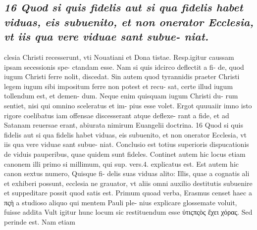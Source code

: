 \documentclass{article}
\begin{document}
\begin{pages}
\subsection*{\textit{16 Quod si quis fidelis aut si qua fidelis habet viduas, eis subuenito, et non onerator Ecclesia, vt iis qua vere viduae sant subue- niat.}}clesia Christi recesserunt, vti Nouatiani et Dona tistae. Resp.igitur caussam ipsam secessionis spe- ctandam esse. Nam si quis idcirco deflectit a fi- de, quod iugum Christi ferre nolit, discedat. Sin autem quod tyrannidis praeter Christi legem iugum sibi impositum ferre non potest et recu- sat, certe illud iugum tollendum est, et demen- dum. Neque enim quisquam iugum Christi du- rum sentiet, nisi qui omnino sceleratus et im- pius esse volet. Ergot quuuaiir imno isto rigore coelibatus iam offensae discesserant atque deflexe- rant a fide, et ad Satanam reuersae erant, abiurata nimirum Euangelii doctrina. 16 Quod si quis fidelis aut si qua fidelis habet viduas, eis subuenito, et non onerator Ecclesia, vt iis qua vere viduae sant subue- niat. Conclusio est totius superioris dispucationis de viduis pauperibus, quae quidem sunt fideles. Continet autem hic locus etiam canonem illi primo si millimum, qui sup. vers.4. explicatus est. Est autem hic canon sextus numero, Quisque fi- delis suas viduas alito: Illis, quae a cognatis ali et exhiberi possunt, ecclesia ne grauator, vt aliis omni auxilio destitutis subuenire et suppeditare possit quod satis est. Primum quoad verba, Erasmus censet haec a πςὴ a studioso aliquo qui mentem Pauli ple- nius explicare glossemate voluit, fuisse addita Vult igitur hunc locum sic restituendum esse ὐτιςπςὸς ἔχει χόρας. Sed perinde est. Nam etiam  \pend

\end{pages}
\end{document}
